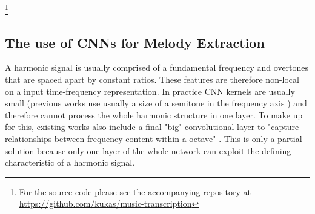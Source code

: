 \documentclass{article}
\begin{document}
\footnote{For the source code please see the accompanying repository at \url{https://github.com/kukas/music-transcription}}

\subsection{The use of CNNs for Melody Extraction}

A harmonic signal is usually comprised of a fundamental frequency and overtones that are spaced apart by constant ratios. These features are therefore non-local on a input time-frequency representation. In practice CNN kernels are usually small (previous works use usually a size of a semitone in the frequency axis \cite{Bittner2017,DBasaranSEssid2018}) and therefore cannot process the whole harmonic structure in one layer. To make up for this, existing works also include a final "big" convolutional layer to "capture relationships between frequency content within a octave" \cite{Bittner2017}. This is only a partial solution because only one layer of the whole network can exploit the defining characteristic of a harmonic signal.



\end{document}
